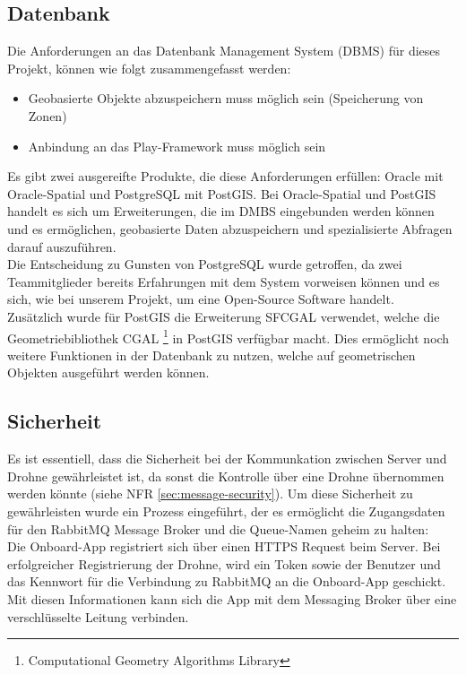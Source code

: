 \subsection{Datenbank}

Die Anforderungen an das Datenbank Management System (\Gls{DBMS}) für dieses Projekt, können wie folgt zusammengefasst werden:

\begin{itemize}
	\item Geobasierte Objekte abzuspeichern muss möglich sein (Speicherung von Zonen)
	\item Anbindung an das Play-Framework muss möglich sein
\end{itemize}

Es gibt zwei ausgereifte Produkte, die diese Anforderungen erfüllen: Oracle mit Oracle-Spatial und PostgreSQL mit PostGIS. Bei Oracle-Spatial und PostGIS handelt es sich um Erweiterungen, die im DMBS eingebunden werden können und es ermöglichen, geobasierte Daten abzuspeichern und spezialisierte Abfragen darauf auszuführen. \\

Die Entscheidung zu Gunsten von PostgreSQL wurde getroffen, da zwei Teammitglieder bereits Erfahrungen mit dem System vorweisen können und es sich, wie bei unserem Projekt, um eine Open-Source Software handelt. \\

Zusätzlich wurde für PostGIS die Erweiterung SFCGAL verwendet, welche die Geometriebibliothek CGAL \footnote{Computational Geometry Algorithms Library} in PostGIS verfügbar macht. Dies ermöglicht noch weitere Funktionen in der Datenbank zu nutzen, welche auf geometrischen Objekten ausgeführt werden können.

\subsection{Sicherheit}
Es ist essentiell, dass die Sicherheit bei der Kommunkation zwischen Server und Drohne gewährleistet ist, da sonst die Kontrolle über eine Drohne übernommen werden könnte (siehe NFR \ref{sec:message-security}). Um diese Sicherheit zu gewährleisten wurde ein Prozess eingeführt, der es ermöglicht die Zugangsdaten für den RabbitMQ Message Broker und die Queue-Namen geheim zu halten: \\

Die Onboard-App registriert sich über einen HTTPS Request beim Server. Bei erfolgreicher Registrierung der Drohne, wird ein Token sowie der Benutzer und das Kennwort für die Verbindung zu RabbitMQ an die Onboard-App geschickt. Mit diesen Informationen kann sich die App mit dem Messaging Broker über eine verschlüsselte Leitung verbinden.\\

